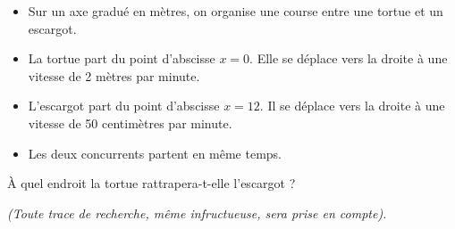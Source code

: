 \begin{itemize}
\item Sur un axe gradué en mètres, on organise une course entre une tortue et un escargot.
\item La tortue part du point d'abscisse $x = 0$. Elle se déplace vers la droite à une vitesse de 2 mètres par minute.
\item L'escargot part du point d'abscisse $x = 12$. Il se déplace vers la droite à une vitesse de 50 centimètres par minute.
\item Les deux concurrents partent en même temps.
\end{itemize}

À quel endroit la tortue rattrapera-t-elle l'escargot ?

\textit{(Toute trace de recherche, même infructueuse, sera prise en compte).}

\bigskip

